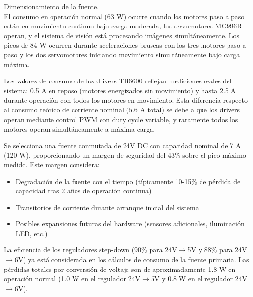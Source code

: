 Dimensionamiento de la fuente.\\
\noindent
El consumo en operación normal (63 W) ocurre cuando los motores paso a paso están en movimiento continuo bajo carga moderada, los servomotores MG996R operan, y el sistema de visión está procesando imágenes simultáneamente. Los picos de 84 W ocurren durante aceleraciones bruscas con los tres motores paso a paso y los dos servomotores iniciando movimiento simultáneamente bajo carga máxima.

Los valores de consumo de los drivers TB6600 reflejan mediciones reales del sistema: 0.5 A en reposo (motores energizados sin movimiento) y hasta 2.5 A durante operación con todos los motores en movimiento. Esta diferencia respecto al consumo teórico de corriente nominal (5.6 A total) se debe a que los drivers operan mediante control PWM con duty cycle variable, y raramente todos los motores operan simultáneamente a máxima carga.

Se selecciona una fuente conmutada de 24V DC con capacidad nominal de 7 A (120 W), proporcionando un margen de seguridad del 43\% sobre el pico máximo medido. Este margen considera:

\begin{itemize}[label=$\bullet$]
\item Degradación de la fuente con el tiempo (típicamente 10-15\% de pérdida de capacidad tras 2 años de operación continua)
\item Transitorios de corriente durante arranque inicial del sistema
\item Posibles expansiones futuras del hardware (sensores adicionales, iluminación LED, etc.)
\end{itemize}

La eficiencia de los reguladores step-down (90\% para 24V$\rightarrow$5V y 88\% para 24V$\rightarrow$6V) ya está considerada en los cálculos de consumo de la fuente primaria. Las pérdidas totales por conversión de voltaje son de aproximadamente 1.8 W en operación normal (1.0 W en el regulador 24V$\rightarrow$5V y 0.8 W en el regulador 24V$\rightarrow$6V).